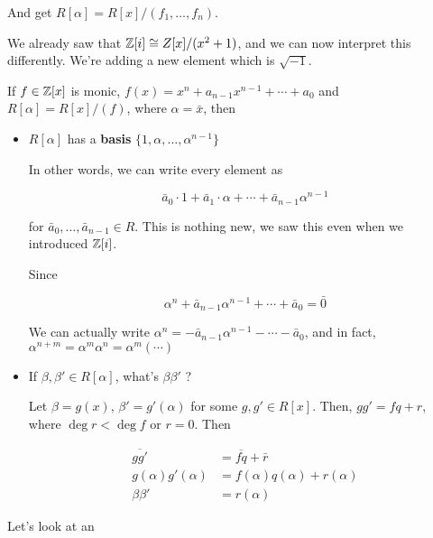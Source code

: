 \documentclass[12pt]{article}
\begin{document}
And get $R[\alpha] = R[x] / (f_1, \dots, f_n)$.

We already saw that ${\mathbb Z}[i] \cong Z[x] / (x^2 + 1)$, and we can now interpret
this differently. We're adding a new element which is $\sqrt{-1}$.

If $f \in {\mathbb Z}[x]$ is monic, $f(x) = x^n + a_{n - 1} x^{n - 1} + \cdots + a_0$ and
$R[\alpha] = R[x] / (f)$, where $\alpha = \bar x$, then

\begin{itemize}
  \item $R[\alpha]$ has a {\bf basis} $\{1, \alpha, \dots, \alpha^{n - 1}\}$

    In other words, we can write every element as

    \[
      \bar a_0 \cdot 1 + \bar a_1 \cdot \alpha + \cdots + \bar a_{n - 1} \alpha^{n - 1}
    \]

    for $\bar a_0, \dots, \bar a_{n - 1} \in R$. This is nothing new, we saw
    this even when we introduced ${\mathbb Z}[i]$.

    Since 

    \[
      \alpha^n + \bar a_{n - 1} \alpha^{n - 1} + \cdots + \bar a_0 = \bar 0
    \]

    We can actually write $\alpha^n = -\bar a_{n - 1} \alpha^{n - 1} - \cdots -
    \bar a_0$, and in fact, $\alpha^{n + m} = \alpha^m \alpha^n = \alpha^m (\cdots)$

  \item If $\beta, \beta' \in R[\alpha]$, what's $\beta \beta'$ ?

    Let $\beta = g(x)$, $\beta' = g'(\alpha)$ for some $g, g' \in R[x]$. Then,
    $gg' = fq + r$, where $\deg r < \deg f$ or $r = 0$. Then 

    \begin{align*}
      \overline{gg'} &= \overline{fq} + \bar r \\
      g(\alpha)g'(\alpha) &= f(\alpha)q(\alpha) + r(\alpha) \\
      \beta \beta' &= r(\alpha)
    \end{align*}
\end{itemize}

Let's look at an
\end{document}
